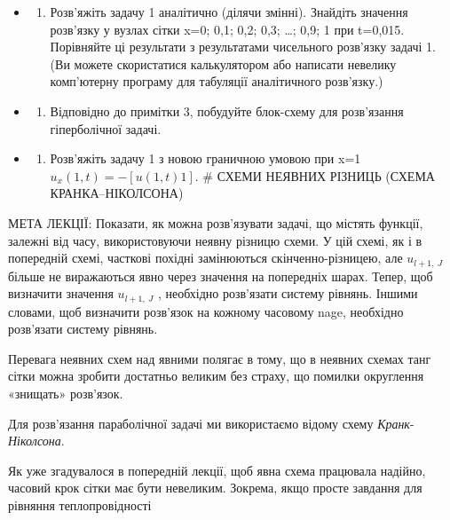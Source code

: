 \documentclass[
  ukrainian,
]{article}
\providecommand{\tightlist}{%
  \setlength{\itemsep}{0pt}\setlength{\parskip}{0pt}}
\begin{document}
\begin{itemize}
\tightlist
\item
  \begin{enumerate}
  \def\labelenumi{\arabic{enumi}.}
  \setcounter{enumi}{1}
  \tightlist
  \item
    Розв'яжіть задачу 1 аналітично (ділячи змінні). Знайдіть значення
    розв'язку у вузлах сітки x=0; 0,1; 0,2; 0,3; \ldots; 0,9; 1 при
    t=0,015. Порівняйте ці результати з результатами чисельного
    розв'язку задачі 1. (Ви можете скористатися калькулятором або
    написати невелику комп'ютерну програму для табуляції аналітичного
    розв'язку.)
  \end{enumerate}
\item
  \begin{enumerate}
  \def\labelenumi{\arabic{enumi}.}
  \setcounter{enumi}{2}
  \tightlist
  \item
    Відповідно до примітки 3, побудуйте блок-схему для розв'язання
    гіперболічної задачі.
  \end{enumerate}
\item
  \begin{enumerate}
  \def\labelenumi{\arabic{enumi}.}
  \setcounter{enumi}{3}
  \tightlist
  \item
    Розв'яжіть задачу 1 з новою граничною умовою при x=1
    \(u_x(1, t) = -[u(1, t) 1].\) \# СХЕМИ НЕЯВНИХ РІЗНИЦЬ (СХЕМА
    КРАНКА--НІКОЛСОНА)
  \end{enumerate}
\end{itemize}

МЕТА ЛЕКЦІЇ: Показати, як можна розв'язувати задачі, що містять функції,
залежні від часу, використовуючи неявну різницю схеми. У цій схемі, як і
в попередній схемі, часткові похідні замінюються скінченно-різницею, але
\(u_{l+1,\ J}\) більше не виражаються явно через значення на попередніх
шарах. Тепер, щоб визначити значення \(u_{l+1,\ J}\) , необхідно
розв'язати систему рівнянь. Іншими словами, щоб визначити розв'язок на
кожному часовому nage, необхідно розв'язати систему рівнянь.

Перевага неявних схем над явними полягає в тому, що в неявних схемах
танг сітки можна зробити достатньо великим без страху, що помилки
округлення «знищать» розв'язок.

Для розв'язання параболічної задачі ми використаємо відому схему
\emph{Кранк}-\emph{Ніколсона}.

Як уже згадувалося в попередній лекції, щоб явна схема працювала
надійно, часовий крок сітки має бути невеликим. Зокрема, якщо просте
завдання для рівняння теплопровідності
\end{document}
